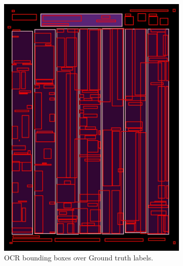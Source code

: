 \documentclass[oneside, english, bibtex]{kththesis}
\begin{document}
\begin{figure}[!htb]
\begin{adjustbox}{center,max size={\textwidth}{0.9\textheight}}
{\begin{subfigure}{0.6\textwidth}
\includegraphics[width=\linewidth]{figures/ocr_bbox/zk6UnuL.jpg}
  \caption{OCR bounding boxes over Ground truth labels.}
  \label{fig:zk6UnuL_GTbb}
\end{subfigure}
\begin{subfigure}{0.6\textwidth}
  \centering

\end{subfigure}}
\end{adjustbox}
\end{figure}
\end{document}
